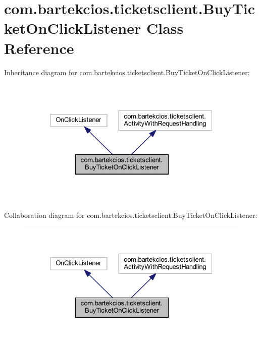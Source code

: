 \hypertarget{classcom_1_1bartekcios_1_1ticketsclient_1_1_buy_ticket_on_click_listener}{}\section{com.\+bartekcios.\+ticketsclient.\+Buy\+Ticket\+On\+Click\+Listener Class Reference}
\label{classcom_1_1bartekcios_1_1ticketsclient_1_1_buy_ticket_on_click_listener}


Inheritance diagram for com.\+bartekcios.\+ticketsclient.\+Buy\+Ticket\+On\+Click\+Listener\+:
\nopagebreak
\begin{figure}[H]
\begin{center}
\leavevmode
\includegraphics[width=326pt]{classcom_1_1bartekcios_1_1ticketsclient_1_1_buy_ticket_on_click_listener__inherit__graph}
\end{center}
\end{figure}


Collaboration diagram for com.\+bartekcios.\+ticketsclient.\+Buy\+Ticket\+On\+Click\+Listener\+:
\nopagebreak
\begin{figure}[H]
\begin{center}
\leavevmode
\includegraphics[width=326pt]{classcom_1_1bartekcios_1_1ticketsclient_1_1_buy_ticket_on_click_listener__coll__graph}
\end{center}
\end{figure}
